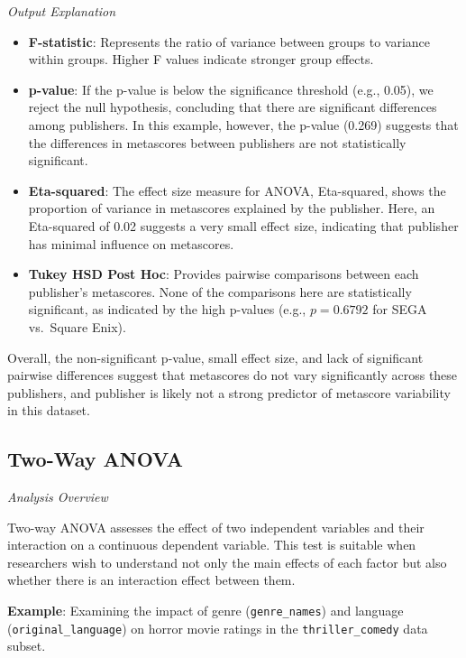 \documentclass[
]{book}
\providecommand{\tightlist}{%
  \setlength{\itemsep}{0pt}\setlength{\parskip}{0pt}}
\begin{document}
\emph{Output Explanation}

\begin{itemize}
\tightlist
\item
  \textbf{F-statistic}: Represents the ratio of variance between groups to variance within groups. Higher F values indicate stronger group effects.
\item
  \textbf{p-value}: If the p-value is below the significance threshold (e.g., 0.05), we reject the null hypothesis, concluding that there are significant differences among publishers. In this example, however, the p-value (0.269) suggests that the differences in metascores between publishers are not statistically significant.
\item
  \textbf{Eta-squared}: The effect size measure for ANOVA, Eta-squared, shows the proportion of variance in metascores explained by the publisher. Here, an Eta-squared of 0.02 suggests a very small effect size, indicating that publisher has minimal influence on metascores.
\item
  \textbf{Tukey HSD Post Hoc}: Provides pairwise comparisons between each publisher's metascores. None of the comparisons here are statistically significant, as indicated by the high p-values (e.g., \(p = 0.6792\) for SEGA vs.~Square Enix).
\end{itemize}

Overall, the non-significant p-value, small effect size, and lack of significant pairwise differences suggest that metascores do not vary significantly across these publishers, and publisher is likely not a strong predictor of metascore variability in this dataset.

\subsection*{Two-Way ANOVA}\label{two-way-anova}

\emph{Analysis Overview}

Two-way ANOVA assesses the effect of two independent variables and their interaction on a continuous dependent variable. This test is suitable when researchers wish to understand not only the main effects of each factor but also whether there is an interaction effect between them.

\textbf{Example}: Examining the impact of genre (\texttt{genre\_names}) and language (\texttt{original\_language}) on horror movie ratings in the \texttt{thriller\_comedy} data subset.
\end{document}
